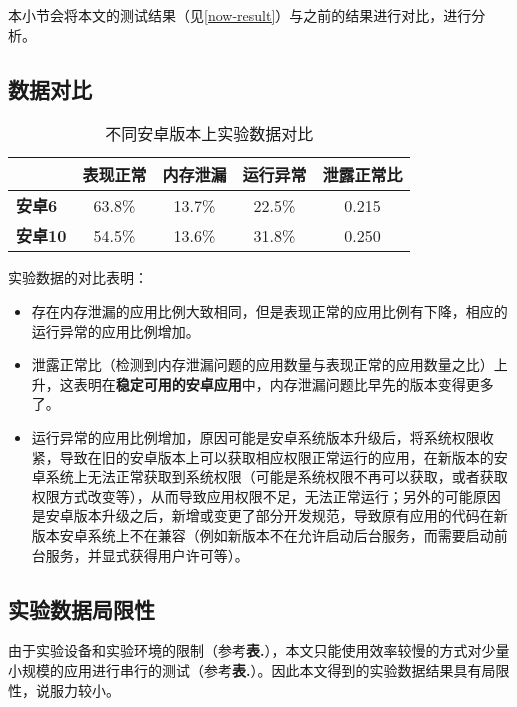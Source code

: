 本小节会将本文的测试结果（见\ref{now-result}）与之前的结果\cite{jun2018lesdroid}进行对比，进行分析。

\subsection{数据对比}
\begin{table}[htb]\footnotesize
	\centering
	\caption{不同安卓版本上实验数据对比}
	\vspace{2mm}
	\begin{tabular}{lcccc}
		\toprule
		&\textbf{表现正常}&\textbf{内存泄漏}&\textbf{运行异常}&\textbf{泄露正常比}\\
		\midrule
		\textbf{安卓6}&63.8\%&13.7\%&22.5\%&0.215\\
		\hline
		\textbf{安卓10}&54.5\%&13.6\%&31.8\%&0.250\\
		\bottomrule
	\end{tabular}
	\label{table:compare}
\end{table}

实验数据的对比表明：
\begin{itemize}
	\item 存在内存泄漏的应用比例大致相同，但是表现正常的应用比例有下降，相应的运行异常的应用比例增加。
	\item 泄露正常比（检测到内存泄漏问题的应用数量与表现正常的应用数量之比）上升，这表明在\textbf{稳定可用的安卓应用}中，内存泄漏问题比早先的版本变得更多了。
	\item 运行异常的应用比例增加，原因可能是安卓系统版本升级后，将系统权限收紧，导致在旧的安卓版本上可以获取相应权限正常运行的应用，在新版本的安卓系统上无法正常获取到系统权限（可能是系统权限不再可以获取，或者获取权限方式改变等），从而导致应用权限不足，无法正常运行；另外的可能原因是安卓版本升级之后，新增或变更了部分开发规范，导致原有应用的代码在新版本安卓系统上不在兼容（例如新版本不在允许启动后台服务，而需要启动前台服务，并显式获得用户许可等）。
\end{itemize}

\subsection{实验数据局限性}

由于实验设备和实验环境的限制（参考\textbf{表.}\redbf{\ref{table:pc-compare}}），本文只能使用效率较慢的方式对少量小规模的应用进行串行的测试（参考\textbf{表.}\redbf{\ref{table:method-compare}}）。因此本文得到的实验数据结果具有局限性，说服力较小。
\newline

